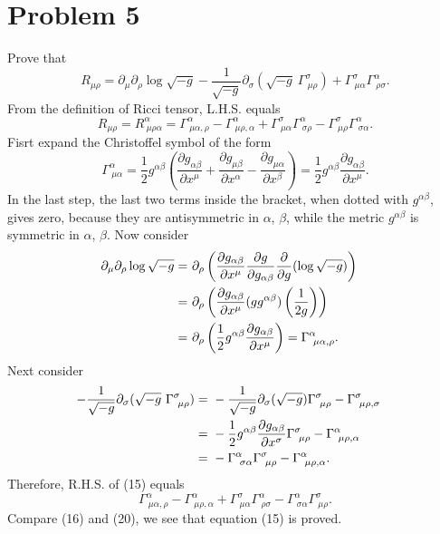 \documentclass{article}
\begin{document}
\section*{Problem 5}
Prove that 
\begin{equation}
    R_{\mu \rho} = \partial_\mu \partial_\rho \log \sqrt{-g}
    -\frac{1}{\sqrt{-g}}\partial_\sigma(\sqrt{-g}~ \Gamma^\sigma_{~\mu \rho})
    + \Gamma^{\sigma}_{~\mu \alpha} \Gamma^\alpha_{~\rho \sigma}.
\end{equation}
From the definition of Ricci tensor, L.H.S. equals
\begin{equation}
    R_{\mu \rho} = R^\alpha_{~\mu \rho \alpha}
    =\Gamma_{~\mu \alpha, \rho}^{\alpha}
    -\Gamma_{~\mu \rho, \alpha}^{\alpha}
    +\Gamma_{~\mu \alpha}^{\sigma} \Gamma_{~\sigma \rho}^{\alpha}
    -\Gamma_{~\mu \rho}^{\sigma} \Gamma_{~\sigma \alpha}^{\alpha}.
\end{equation}
Fisrt expand the Christoffel symbol of the form
\begin{equation}
    \Gamma^\alpha_{~\mu \alpha} = \frac{1}{2} g^{\alpha \beta}
    \left(
        \frac{\partial g_{\alpha \beta}}{\partial x^\mu}
        +\frac{\partial g_{\mu \beta}}{\partial x^\alpha}
        -\frac{\partial g_{\mu \alpha}}{\partial x^\beta}
    \right)
    =\frac{1}{2} g^{\alpha \beta} \frac{\partial g_{\alpha \beta}}{\partial x^\mu}.
\end{equation}
In the last step, the last two terms inside the bracket, when dotted with $g^{\alpha \beta}$,
gives zero, because they are antisymmetric in $\alpha$, $\beta$, while the metric $g^{\alpha \beta}$
is symmetric in $\alpha$, $\beta$.
Now consider 
\begin{align}
    \partial_\mu \partial_\rho \log \sqrt{-g} 
    =&~ \partial_\rho\left(\frac{\partial g_{\alpha \beta}}{\partial x^\mu}
    \frac{\partial g}{\partial g_{\alpha \beta}}\frac{\partial }{\partial g}
    (\log \sqrt{-g})\right)\cr
    =&~ \partial_\rho\left(\frac{\partial g_{\alpha \beta}}{\partial x^\mu}
    (g g^{\alpha \beta})\left(\frac{1}{2g}\right)\right)\cr
    =&~ \partial_\rho \left(\frac{1}{2} g^{\alpha \beta}
    \frac{\partial g_{\alpha \beta}}{\partial x^\mu}\right)
    = \Gamma^\alpha_{~\mu \alpha, \rho}.
\end{align}
Next consider 
\begin{align}
    -\frac{1}{\sqrt{-g}} \partial_\sigma(\sqrt{-g} ~\Gamma^\sigma_{~\mu \rho})
    =&~ -\frac{1}{\sqrt{-g}} \partial_\sigma(\sqrt{-g}) \Gamma^\sigma_{~\mu \rho}
    -\Gamma^\sigma_{~\mu \rho, \sigma} \cr
    =&~ -\frac{1}{2} g^{\alpha \beta} \frac{\partial g_{\alpha \beta}}{\partial x^\sigma}
    \Gamma^\sigma_{~\mu \rho} - \Gamma^\alpha_{~\mu \rho, \alpha}\cr
    =&~ -\Gamma^\alpha_{~\sigma\alpha} \Gamma^\sigma_{~\mu \rho} - 
    \Gamma^\alpha_{~\mu\rho,\alpha}.
\end{align}
Therefore, R.H.S. of (15) equals
\begin{equation}
    \Gamma^\alpha_{~\mu \alpha, \rho} - \Gamma^\alpha_{~\mu \rho, \alpha}
    + \Gamma^\sigma_{~\mu \alpha} \Gamma^\alpha_{~\rho \sigma} 
    - \Gamma^\alpha_{~\sigma \alpha} \Gamma^\sigma_{~\mu \rho}.
\end{equation}
Compare (16) and (20), we see that equation (15) is proved.
\end{document}
